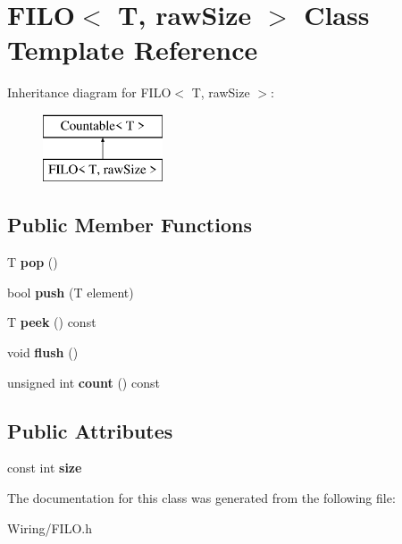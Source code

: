 \hypertarget{class_f_i_l_o}{}\section{F\+I\+L\+O$<$ T, raw\+Size $>$ Class Template Reference}
\label{class_f_i_l_o}
Inheritance diagram for F\+I\+L\+O$<$ T, raw\+Size $>$\+:\begin{figure}[H]
\begin{center}
\leavevmode
\includegraphics[height=2.000000cm]{class_f_i_l_o}
\end{center}
\end{figure}
\subsection*{Public Member Functions}
\begin{DoxyCompactItemize}
\item 
\hypertarget{class_f_i_l_o_ac71e64def1cb48cbe79d7d86b227957f}{}T {\bfseries pop} ()\label{class_f_i_l_o_ac71e64def1cb48cbe79d7d86b227957f}

\item 
\hypertarget{class_f_i_l_o_a011d677b7e0fd455d2350522afad7b97}{}bool {\bfseries push} (T element)\label{class_f_i_l_o_a011d677b7e0fd455d2350522afad7b97}

\item 
\hypertarget{class_f_i_l_o_a8e8d37917027466d3fdcd4e76c4a2712}{}T {\bfseries peek} () const \label{class_f_i_l_o_a8e8d37917027466d3fdcd4e76c4a2712}

\item 
\hypertarget{class_f_i_l_o_a3e7160472456d1019e3c902cbfe95547}{}void {\bfseries flush} ()\label{class_f_i_l_o_a3e7160472456d1019e3c902cbfe95547}

\item 
\hypertarget{class_f_i_l_o_a58be74f24845f0594e82f269964735ab}{}unsigned int {\bfseries count} () const \label{class_f_i_l_o_a58be74f24845f0594e82f269964735ab}

\end{DoxyCompactItemize}
\subsection*{Public Attributes}
\begin{DoxyCompactItemize}
\item 
\hypertarget{class_f_i_l_o_a36842f15fa120cf954e9b4036b600b73}{}const int {\bfseries size}\label{class_f_i_l_o_a36842f15fa120cf954e9b4036b600b73}

\end{DoxyCompactItemize}


The documentation for this class was generated from the following file\+:\begin{DoxyCompactItemize}
\item 
Wiring/F\+I\+L\+O.\+h\end{DoxyCompactItemize}
